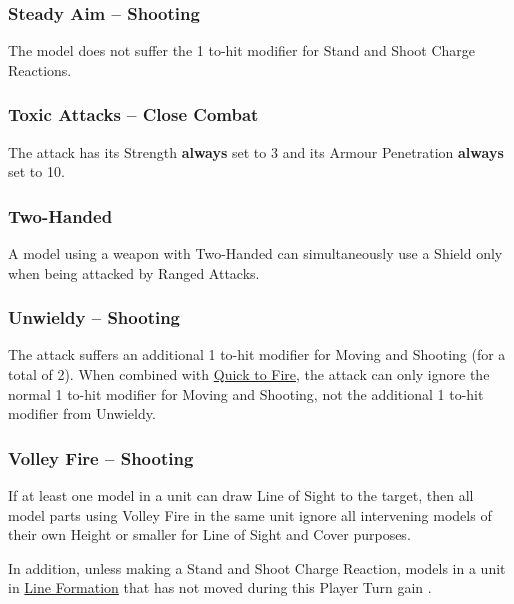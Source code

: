 \subsubsection{Steady Aim -- Shooting}
\idx[main=y]{\steadyaim}\label{steady_aim}

The model does not suffer the \minuss{}1 to-hit modifier for Stand and Shoot Charge Reactions.
\subsubsection{Toxic Attacks -- Close Combat}
\idx[main=y]{\toxicattacks}\label{toxic_attacks}

The attack has its Strength \textbf{always} set to 3 and its Armour Penetration \textbf{always} set to 10.

\subsubsection{Two-Handed}
\idx[main=y]{\twohanded}\label{twohanded}

A model using a weapon with Two-Handed can simultaneously use a Shield only when being attacked by Ranged Attacks.

\subsubsection{Unwieldy -- Shooting}
\idx[main=y]{\unwieldy}\label{unwieldy}

The attack suffers an additional \minuss{}1 to-hit modifier for Moving and Shooting (for a total of \minuss{}2). When combined with \hyperref[quick_to_fire]{Quick to Fire}, the attack can only ignore the normal \minuss{}1 to-hit modifier for Moving and Shooting, not the additional \minuss{}1 to-hit modifier from Unwieldy.

\subsubsection{Volley Fire -- Shooting}
\idx[main=y]{\volleyfire}\label{volley_fire}

If at least one model in a unit can draw Line of Sight to the target, then all model parts using Volley Fire in the same unit ignore all intervening models of their own Height or smaller for Line of Sight and Cover purposes.

In addition, unless making a Stand and Shoot Charge Reaction, models in a unit in \hyperref[line_formation]{Line Formation} that has not moved during this Player Turn gain \shootinextrarank{}.

